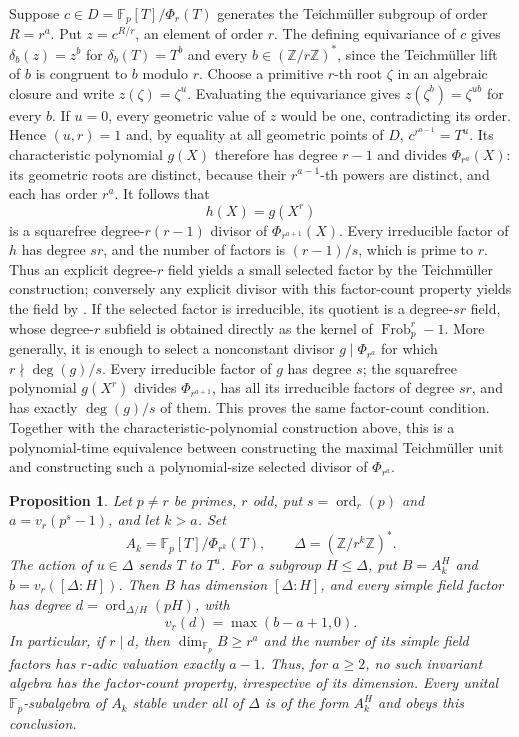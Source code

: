 \documentclass[11pt]{article}
\newtheorem{proposition}[theorem]{Proposition}
\theoremstyle{definition}
\theoremstyle{remark}
\begin{document}
Suppose $c\in D=\mathbb F_p[T]/\Phi_r(T)$ generates the
Teichm\"uller subgroup of order $R=r^a$.
Put $z=c^{R/r}$, an element of order $r$.
The defining equivariance of $c$ gives
$\delta_b(z)=z^b$ for $\delta_b(T)=T^b$ and every
$b\in(\mathbb Z/r\mathbb Z)^*$, since the Teichm\"uller lift of $b$
is congruent to $b$ modulo $r$.
Choose a primitive $r$-th root $\zeta$ in an algebraic closure and
write $z(\zeta)=\zeta^u$.
Evaluating the equivariance gives
$z(\zeta^b)=\zeta^{ub}$ for every $b$.
If $u=0$, every geometric value of $z$ would be one, contradicting
its order.  Hence $(u,r)=1$ and, by equality at all geometric
points of $D$, $c^{r^{a-1}}=T^u$.
Its characteristic polynomial $g(X)$ therefore has degree $r-1$
and divides $\Phi_{r^a}(X)$: its geometric roots are distinct,
because their $r^{a-1}$-th powers are distinct, and each has order
$r^a$.
It follows that
\[
 h(X)=g(X^r)
\]
is a squarefree degree-$r(r-1)$ divisor of $\Phi_{r^{a+1}}(X)$.
Every irreducible factor of $h$ has degree $sr$, and the number of
factors is $(r-1)/s$, which is prime to $r$.
Thus an explicit degree-$r$ field yields a small selected factor by
the Teichm\"uller construction; conversely any explicit divisor with
this factor-count property yields the field by
\cite[Theorem~1.4, p.~2]{BhargavaEtAl2017}.
If the selected factor is irreducible, its quotient is a degree-$sr$
field, whose degree-$r$ subfield is obtained directly as the kernel
of $\operatorname{Frob}_p^r-1$.
More generally, it is enough to select a nonconstant divisor
$g\mid\Phi_{r^a}$ for which $r\nmid\deg(g)/s$.
Every irreducible factor of $g$ has degree $s$; the squarefree
polynomial $g(X^r)$ divides $\Phi_{r^{a+1}}$, has all its
irreducible factors of degree $sr$, and has exactly $\deg(g)/s$
of them.  This proves the same factor-count condition.
Together with the characteristic-polynomial construction above,
this is a polynomial-time equivalence between constructing the
maximal Teichm\"uller unit and constructing such a polynomial-size
selected divisor of $\Phi_{r^a}$.

\begin{proposition}\label{prop:cyclotomic-compression}
Let $p\ne r$ be primes, $r$ odd, put
$s=\operatorname{ord}_r(p)$ and $a=v_r(p^s-1)$, and let $k>a$.
Set
\[
 A_k=\mathbb F_p[T]/\Phi_{r^k}(T),\qquad
 \Delta=(\mathbb Z/r^k\mathbb Z)^*.
\]
The action of $u\in\Delta$ sends $T$ to $T^u$.
For a subgroup $H\le\Delta$, put $B=A_k^H$ and
$b=v_r([\Delta:H])$.
Then $B$ has dimension $[\Delta:H]$, and every simple field factor
has degree $d=\operatorname{ord}_{\Delta/H}(pH)$, with
\[
 v_r(d)=\max(b-a+1,0).
\]
In particular, if $r\mid d$, then $\dim_{\mathbb F_p}B\ge r^a$
and the number of its simple field factors has $r$-adic valuation
exactly $a-1$.
Thus, for $a\ge2$, no such invariant algebra has the factor-count
property, irrespective of its dimension.
Every unital $\mathbb F_p$-subalgebra of $A_k$ stable under all of
$\Delta$ is of the form $A_k^H$ and obeys this conclusion.
\end{proposition}
\end{document}
